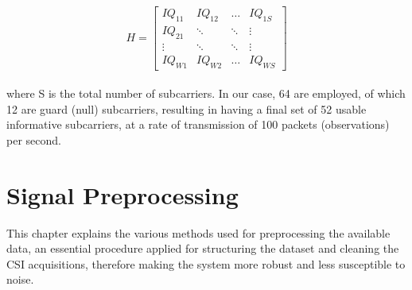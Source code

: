 \documentclass[binding=0.7cm, oneside]{sapthesis}
\begin{document}
\[
    H = \begin{bmatrix}
        IQ_{11} & IQ_{12} & \dots  & IQ_{1S} \\
        IQ_{21} & \ddots  & \ddots & \vdots  \\
        \vdots  & \ddots  & \ddots & \vdots  \\
        IQ_{W1} & IQ_{W2} & \dots  & IQ_{WS}
    \end{bmatrix}
\]
\\
where S is the total number of subcarriers. In our case, 64 are employed, of which 12 are guard (null) subcarriers, resulting in having a final set of 52
usable informative subcarriers, at a rate of transmission of 100 packets (observations) per second.

\chapter{Signal Preprocessing}
\label{chap:preprocess}
This chapter explains the various methods used for preprocessing the available data, an essential procedure applied for structuring the dataset and
cleaning the CSI acquisitions, therefore making the system more robust and less susceptible to noise.
\end{document}
